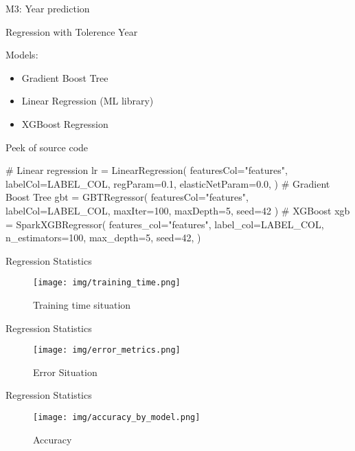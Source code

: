 \documentclass{beamer}
\begin{document}
\begin{section}{M3: Year prediction}
\begin{frame}{Regression with Tolerence Year}
\begin{itemize}
        \end{itemize}
    Models:
        \begin{itemize}
            \item Gradient Boost Tree
            \item Linear Regression (ML library)
            \item XGBoost Regression
        \end{itemize}
    \end{frame}
    \begin{frame}[fragile]{Peek of source code}
    \begin{mycodepython}
# Linear regression
lr = LinearRegression(
    featuresCol="features",
    labelCol=LABEL_COL,
    regParam=0.1,
    elasticNetParam=0.0,
)
# Gradient Boost Tree
gbt = GBTRegressor(
    featuresCol="features", labelCol=LABEL_COL, maxIter=100, maxDepth=5, seed=42
    )
# XGBoost
xgb = SparkXGBRegressor(
    features_col="features", label_col=LABEL_COL, n_estimators=100, max_depth=5, seed=42,
    )
    \end{mycodepython}
    \end{frame}

    \begin{frame}{Regression Statistics}
    \begin{figure}
        \centering
        \texttt{[image: img/training\_time.png]}
        \caption{Training time situation}
        \label{fig:training_time}
    \end{figure}
    \end{frame}

    \begin{frame}{Regression Statistics}
    \begin{figure}
        \centering
        \texttt{[image: img/error\_metrics.png]}
        \caption{Error Situation}
        \label{fig:error}
    \end{figure}
    \end{frame}

    \begin{frame}{Regression Statistics}
    \begin{figure}
        \centering
        \texttt{[image: img/accuracy\_by\_model.png]}
        \caption{Accuracy}
        \label{fig:accuracy}
    \end{figure}
    \end{frame}


\end{section}
\end{document}
